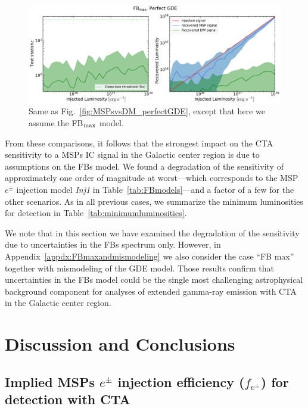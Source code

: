 \documentclass[doublespace,nopageskip]{VTthesis} %
\begin{document}
\begin{figure}[htb]
    \begin{center}
    \includegraphics[width=\textwidth]{Figures/CTA/TS-dm-mis-False-Fermi-min-False.pdf}
\caption{Same as Fig.~\ref{fig:MSPsvsDM_perfectGDE}, except that here we assume the FB$_{\rm max}$ model.}\label{fig:MSPsvsDM_perfectGDEFBmax}
    \end{center}
\end{figure}

From these comparisons, it follows that the strongest impact on the CTA sensitivity to a MSPs IC signal in the Galactic center region is due to assumptions on the FBs model. We found a degradation of the sensitivity of approximately one order of magnitude at worst---which corresponds to the MSP $e^\pm$ injection model \textit{Inj1} in Table~\ref{tab:FBmodels}---and a factor of a few for the other scenarios. As in all previous cases, we summarize the minimum luminosities for detection in Table~\ref{tab:minimumluminosities}.  

We note that in this section we have examined the degradation of the sensitivity due to uncertainties in the FBs spectrum only. However, in Appendix~\ref{appdx:FBmaxandmismodeling} we also consider the case ``FB max'' together with  mismodeling of the GDE model. Those results confirm that uncertainties in the FBs model could be the single most challenging astrophysical background component for analyses of extended gamma-ray emission with CTA in the Galactic center region.     

\section{Discussion and Conclusions}
\label{sec:discussions}

\subsection{Implied MSPs $e^\pm$ injection efficiency ($f_{e^\pm}$) for detection with CTA}
\label{sec:efficiency}
\end{document}
